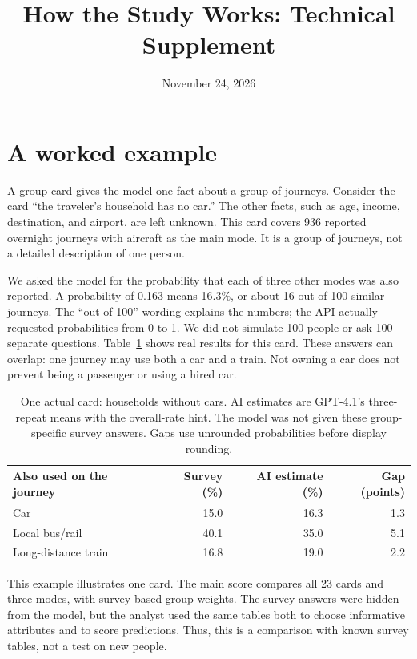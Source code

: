 \documentclass{article}
\title{How the Study Works: Technical Supplement}
\author{}
\date{November 24, 2026}
\begin{document}
\maketitle

\section{A worked example}
A group card gives the model one fact about a group of journeys. Consider the card ``the traveler's household has no car.'' The other facts, such as age, income, destination, and airport, are left unknown. This card covers 936 reported overnight journeys with aircraft as the main mode. It is a group of journeys, not a detailed description of one person.

We asked the model for the probability that each of three other modes was also reported. A probability of 0.163 means 16.3\%, or about 16 out of 100 similar journeys. The ``out of 100'' wording explains the numbers; the API actually requested probabilities from 0 to 1. We did not simulate 100 people or ask 100 separate questions. Table~\ref{tab:example} shows real results for this card. These answers can overlap: one journey may use both a car and a train. Not owning a car does not prevent being a passenger or using a hired car.

\begin{table}[htbp]
\centering\small
\begin{tabular}{lrrr}
\toprule
Also used on the journey & Survey (\%) & AI estimate (\%) & Gap (points)\\
\midrule
Car & 15.0 & 16.3 & 1.3\\
Local bus/rail & 40.1 & 35.0 & 5.1\\
Long-distance train & 16.8 & 19.0 & 2.2\\
\bottomrule
\end{tabular}
\caption{One actual card: households without cars. AI estimates are GPT-4.1's three-repeat means with the overall-rate hint. The model was not given these group-specific survey answers. Gaps use unrounded probabilities before display rounding.}
\label{tab:example}
\end{table}

This example illustrates one card. The main score compares all 23 cards and three modes, with survey-based group weights. The survey answers were hidden from the model, but the analyst used the same tables both to choose informative attributes and to score predictions. Thus, this is a comparison with known survey tables, not a test on new people.
\end{document}
